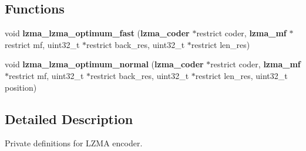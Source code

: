 \subsection*{Functions}
\begin{DoxyCompactItemize}
\item 
void {\bfseries lzma\-\_\-lzma\-\_\-optimum\-\_\-fast} ({\bf lzma\-\_\-coder} $\ast$restrict coder, {\bf lzma\-\_\-mf} $\ast$restrict mf, uint32\-\_\-t $\ast$restrict back\-\_\-res, uint32\-\_\-t $\ast$restrict len\-\_\-res)\label{lzma__encoder__private_8h_a0fd48fee67afb38e259dd0393b998d95}

\item 
void {\bfseries lzma\-\_\-lzma\-\_\-optimum\-\_\-normal} ({\bf lzma\-\_\-coder} $\ast$restrict coder, {\bf lzma\-\_\-mf} $\ast$restrict mf, uint32\-\_\-t $\ast$restrict back\-\_\-res, uint32\-\_\-t $\ast$restrict len\-\_\-res, uint32\-\_\-t position)\label{lzma__encoder__private_8h_ac60616f163a672ef8aed2ce1434f9bb6}

\end{DoxyCompactItemize}


\subsection{Detailed Description}
Private definitions for L\-Z\-M\-A encoder. 